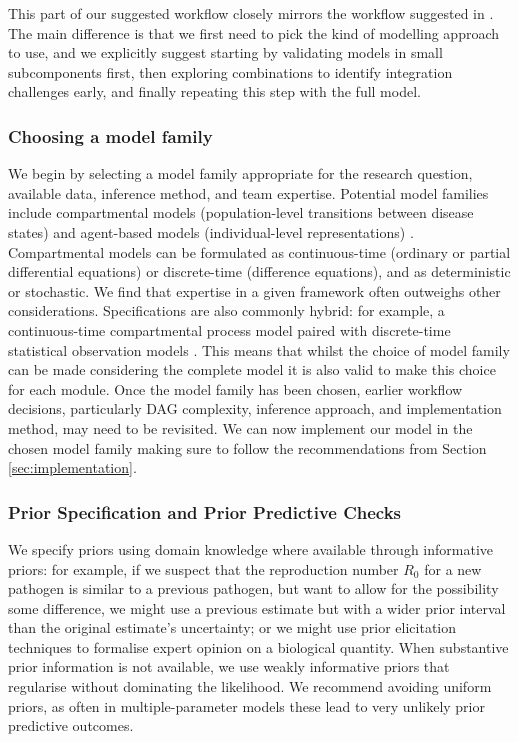 \documentclass{article}
\begin{document}
This part of our suggested workflow closely mirrors the workflow suggested in \citet{gelman2020bayesian}.
The main difference is that we first need to pick the kind of modelling approach to use, and we explicitly suggest starting by validating models in small subcomponents first, then exploring combinations to identify integration challenges early, and finally repeating this step with the full model.

\subsubsection{Choosing a model family}

We begin by selecting a model family appropriate for the research question, available data, inference method, and team expertise.
Potential model families include compartmental models (population-level transitions between disease states) and agent-based models (individual-level representations) \citep{skrip2019modeling}.
Compartmental models can be formulated as continuous-time (ordinary or partial differential equations) or discrete-time (difference equations), and as deterministic or stochastic.
We find that expertise in a given framework often outweighs other considerations.
Specifications are also commonly hybrid: for example, a continuous-time compartmental process model paired with discrete-time statistical observation models \citep{bouranis2025bayesian}.
This means that whilst the choice of model family can be made considering the complete model it is also valid to make this choice for each module.
Once the model family has been chosen, earlier workflow decisions, particularly DAG complexity, inference approach, and implementation method, may need to be revisited.
We can now implement our model in the chosen model family making sure to follow the recommendations from Section \ref{sec:implementation}.

\subsubsection{Prior Specification and Prior Predictive Checks}

We specify priors using domain knowledge where available through informative priors: for example, if we suspect that the reproduction number $R_0$ for a new pathogen is similar to a previous pathogen, but want to allow for the possibility some difference, we might use a previous estimate but with a wider prior interval than the original estimate's uncertainty; or we might use prior elicitation techniques \citep{o2006uncertain} to formalise expert opinion on a biological quantity. When substantive prior information is not available, we use weakly informative priors that regularise without dominating the likelihood. We recommend avoiding uniform priors, as often in multiple-parameter models these lead to very unlikely prior predictive outcomes.
\end{document}
